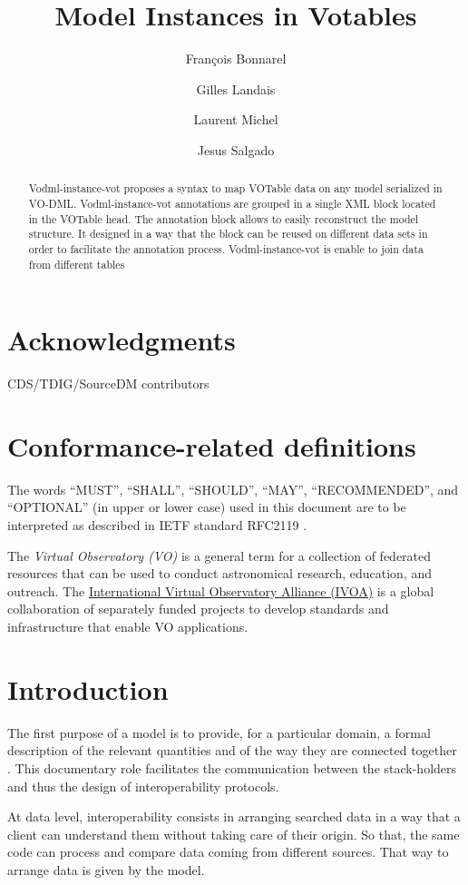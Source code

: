 \documentclass[11pt,a4paper]{ivoa}
\title{Model Instances in Votables}
\author{François Bonnarel}
\author{Gilles Landais}
\author{Laurent Michel}
\author{Jesus Salgado}
\begin{document}
\begin{abstract}
Vodml-instance-vot proposes a syntax to map VOTable data on any model serialized in VO-DML.
Vodml-instance-vot annotations are grouped in a single XML block located in the VOTable head. The annotation block allows to easily reconstruct the model structure. It designed in a way that the block can be reused on different data sets in order to facilitate the annotation process.
Vodml-instance-vot is enable to join data from different tables
\end{abstract}


\section*{Acknowledgments}
CDS/TDIG/SourceDM contributors

\section*{Conformance-related definitions}

The words ``MUST'', ``SHALL'', ``SHOULD'', ``MAY'', ``RECOMMENDED'', and
``OPTIONAL'' (in upper or lower case) used in this document are to be
interpreted as described in IETF standard RFC2119 \citep{std:RFC2119}.

The \emph{Virtual Observatory (VO)} is a
general term for a collection of federated resources that can be used
to conduct astronomical research, education, and outreach.
The \href{http://www.ivoa.net}{International
Virtual Observatory Alliance (IVOA)} is a global
collaboration of separately funded projects to develop standards and
infrastructure that enable VO applications.


\section{Introduction}
The first purpose of a model is to provide,  for a particular domain, a formal description of the relevant quantities and of the way they are connected together .
This documentary role facilitates the communication between the stack-holders and thus the design of interoperability protocols. 

At data level, interoperability consists in arranging searched data in a way that a client can understand them without taking care of their origin. So that, the same code can process and compare data coming from different sources.  That way to arrange data is given by the model.
\end{document}
